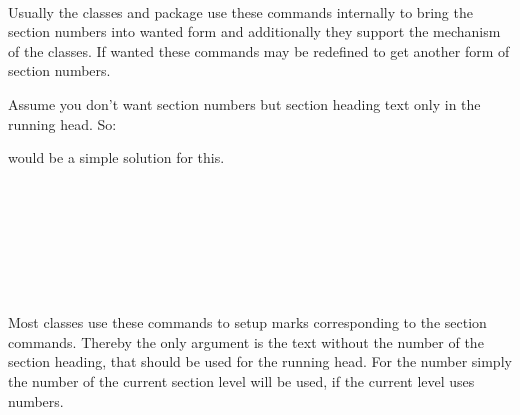 \begin{Declaration}
  \\
  \\
  \\
  \\
  \\
  \\
\end{Declaration}
%
%
%
%
%
%
%
Usually the \KOMAScript{} classes and package  use these
commands internally to bring the section numbers into wanted form and
additionally they support the  mechanism of the \KOMAScript{}
classes. If wanted these commands may be redefined to get another form of
section numbers.%
%
\begin{Example}
  Assume you don't want section numbers but section heading text only in the
  running head. So:
\begin{lstcode}
  \renewcommand*{\sectionmarkformat}{}
\end{lstcode}
  would be a simple solution for this.
\end{Example}
%
%
%
%
%
%
%
%

\begin{Declaration}
  \\
  \\
  \\
  \\
  \\
  \\
\end{Declaration}
%
%
%
%
%
%
%
Most classes use these commands to setup marks corresponding to the
section commands. Thereby the only argument is the text without the number of
the section heading, that should be used for the running head. For the number
simply the number of the current section level will be used, if the current
level uses numbers.

